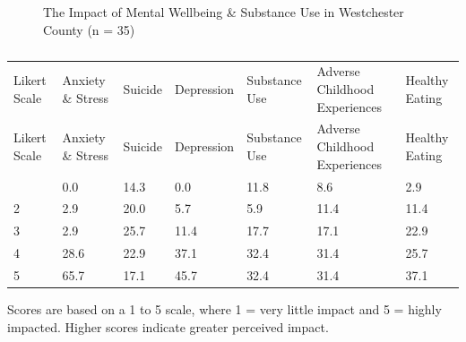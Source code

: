 \documentclass[
  english,
  letterpaper,
]{report}
\begin{document}
\begin{figure}


\caption{\label{fig-wc-impact-mhsu}The Impact of Mental Wellbeing \&
Substance Use in Westchester County (n = 35)}

\end{figure}%

\begin{longtable}[]{@{}lllllll@{}}

\caption{\label{tbl-wc-impact-mhsu}The Impact of Mental Wellbeing \&
Substance Use in Westchester County (n = 35)}

\tabularnewline

\caption{}\label{T_606e2}\tabularnewline
\toprule\noalign{}
Likert Scale & Anxiety \& Stress & Suicide & Depression & Substance Use
& Adverse Childhood Experiences & Healthy Eating \\
\midrule\noalign{}
\endfirsthead
\toprule\noalign{}
Likert Scale & Anxiety \& Stress & Suicide & Depression & Substance Use
& Adverse Childhood Experiences & Healthy Eating \\
\midrule\noalign{}
\endhead
\bottomrule\noalign{}
\endlastfoot
1 & 0.0 & 14.3 & 0.0 & 11.8 & 8.6 & 2.9 \\
2 & 2.9 & 20.0 & 5.7 & 5.9 & 11.4 & 11.4 \\
3 & 2.9 & 25.7 & 11.4 & 17.7 & 17.1 & 22.9 \\
4 & 28.6 & 22.9 & 37.1 & 32.4 & 31.4 & 25.7 \\
5 & 65.7 & 17.1 & 45.7 & 32.4 & 31.4 & 37.1 \\

\end{longtable}

\begin{tcolorbox}[enhanced jigsaw, breakable, leftrule=.75mm, title=\textcolor{quarto-callout-note-color}{\faInfo}\hspace{0.5em}{Note}, bottomrule=.15mm, opacityback=0, left=2mm, colback=white, bottomtitle=1mm, coltitle=black, colbacktitle=quarto-callout-note-color!10!white, colframe=quarto-callout-note-color-frame, opacitybacktitle=0.6, toptitle=1mm, titlerule=0mm, arc=.35mm, rightrule=.15mm, toprule=.15mm]

Scores are based on a 1 to 5 scale, where 1 = very little impact and 5 =
highly impacted. Higher scores indicate greater perceived impact.

\end{tcolorbox}
\end{document}
